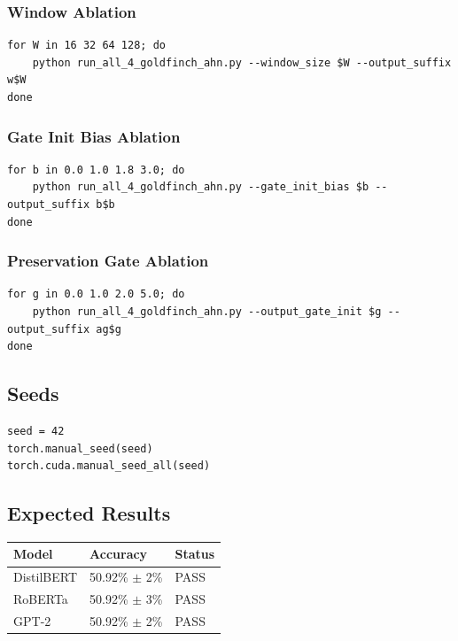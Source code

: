 \subsubsection{Window Ablation}

\begin{lstlisting}
for W in 16 32 64 128; do
    python run_all_4_goldfinch_ahn.py --window_size $W --output_suffix w$W
done
\end{lstlisting}

\subsubsection{Gate Init Bias Ablation}

\begin{lstlisting}
for b in 0.0 1.0 1.8 3.0; do
    python run_all_4_goldfinch_ahn.py --gate_init_bias $b --output_suffix b$b
done
\end{lstlisting}

\subsubsection{Preservation Gate Ablation}

\begin{lstlisting}
for g in 0.0 1.0 2.0 5.0; do
    python run_all_4_goldfinch_ahn.py --output_gate_init $g --output_suffix ag$g
done
\end{lstlisting}

\subsection{Seeds}

\begin{lstlisting}
seed = 42
torch.manual_seed(seed)
torch.cuda.manual_seed_all(seed)
\end{lstlisting}

\subsection{Expected Results}

\begin{table}[H]
\centering
\small
\begin{tabular}{lll}
\toprule
\textbf{Model} & \textbf{Accuracy} & \textbf{Status} \\
\midrule
DistilBERT & 50.92\% $\pm$ 2\% & PASS \\
RoBERTa & 50.92\% $\pm$ 3\% & PASS \\
GPT-2 & 50.92\% $\pm$ 2\% & PASS \\
\bottomrule
\end{tabular}
\end{table}

